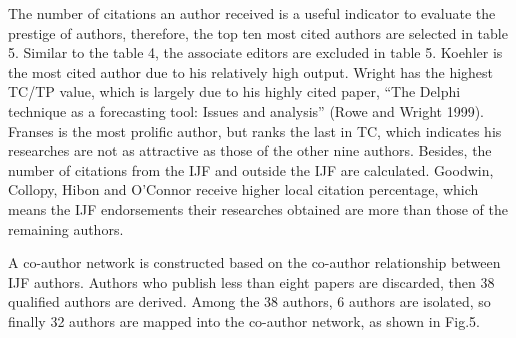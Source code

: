 \documentclass[11pt,a4paper]{elsarticle} %
\begin{document}
The number of citations an author received is a useful indicator to
evaluate the prestige of authors, therefore, the top ten most cited
authors are selected in table 5. Similar to the table 4, the associate
editors are excluded in table 5. Koehler is the most cited author due to
his relatively high output. Wright has the highest TC/TP value, which is
largely due to his highly cited paper, ``The Delphi technique as a
forecasting tool: Issues and analysis'' (Rowe and Wright 1999). Franses
is the most prolific author, but ranks the last in TC, which indicates
his researches are not as attractive as those of the other nine authors.
Besides, the number of citations from the IJF and outside the IJF are
calculated. Goodwin, Collopy, Hibon and O'Connor receive higher local
citation percentage, which means the IJF endorsements their researches
obtained are more than those of the remaining authors.

\begin{table}[!htbp]
\centering
\caption{Information about the top ten most cited IJF authors}
\end{table}

A co-author network is constructed based on the co-author relationship
between IJF authors. Authors who publish less than eight papers are
discarded, then 38 qualified authors are derived. Among the 38 authors,
6 authors are isolated, so finally 32 authors are mapped into the
co-author network, as shown in Fig.5.
\end{document}
